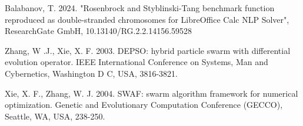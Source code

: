 \documentclass[runningheads]{llncs}
\begin{document}
\begin{thebibliography}{8}
 Balabanov, T. 2024. "Rosenbrock and Styblinski-Tang benchmark function reproduced as double-stranded chromosomes for LibreOffice Calc NLP Solver", ResearchGate GmbH, 10.13140/RG.2.2.14156.59528

 Zhang, W .J., Xie, X. F. 2003. DEPSO: hybrid particle swarm with differential evolution operator. IEEE International Conference on Systems, Man and Cybernetics, Washington D C, USA, 3816-3821.

 Xie, X. F., Zhang, W. J. 2004. SWAF: swarm algorithm framework for numerical optimization. Genetic and Evolutionary Computation Conference (GECCO), Seattle, WA, USA, 238-250.

\end{thebibliography}
\end{document}
